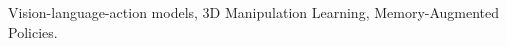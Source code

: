 \documentclass[journal]{IEEEtran}
\begin{document}


\begin{IEEEkeywords}
Vision-language-action models, 3D Manipulation Learning, Memory-Augmented Policies.
\end{IEEEkeywords}











\clearpage
\appendix


\end{document}
